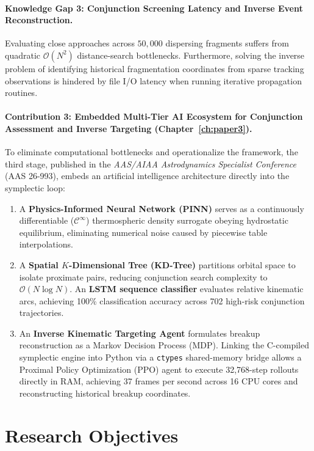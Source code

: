\documentclass[12pt,letterpaper,twoside]{book}
\begin{document}
\paragraph{Knowledge Gap 3: Conjunction Screening Latency and Inverse Event Reconstruction.}
Evaluating close approaches across $50,000$ dispersing fragments suffers from quadratic $\mathcal{O}(N^2)$ distance-search bottlenecks. Furthermore, solving the inverse problem of identifying historical fragmentation coordinates from sparse tracking observations is hindered by file I/O latency when running iterative propagation routines.

\paragraph{Contribution 3: Embedded Multi-Tier AI Ecosystem for Conjunction Assessment and Inverse Targeting (Chapter~\ref{ch:paper3}).}
To eliminate computational bottlenecks and operationalize the framework, the third stage, published in the \textit{AAS/AIAA Astrodynamics Specialist Conference} (AAS 26-993), embeds an artificial intelligence architecture directly into the symplectic loop:
\begin{enumerate}
    \item A \textbf{Physics-Informed Neural Network (PINN)} serves as a continuously differentiable ($\mathcal{C}^\infty$) thermospheric density surrogate obeying hydrostatic equilibrium, eliminating numerical noise caused by piecewise table interpolations.
    \item A \textbf{Spatial $K$-Dimensional Tree (KD-Tree)} partitions orbital space to isolate proximate pairs, reducing conjunction search complexity to $\mathcal{O}(N \log N)$. An \textbf{LSTM sequence classifier} evaluates relative kinematic arcs, achieving 100\% classification accuracy across 702 high-risk conjunction trajectories.
    \item An \textbf{Inverse Kinematic Targeting Agent} formulates breakup reconstruction as a Markov Decision Process (MDP). Linking the C-compiled symplectic engine into Python via a \texttt{ctypes} shared-memory bridge allows a Proximal Policy Optimization (PPO) agent to execute 32,768-step rollouts directly in RAM, achieving 37 frames per second across 16 CPU cores and reconstructing historical breakup coordinates.
\end{enumerate}

\section{Research Objectives}
\end{document}
